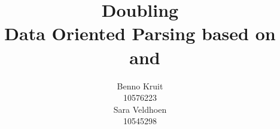 \documentclass[11pt]{article}
\title{Doubling \dops \\ 
{\normalsize Data Oriented Parsing based on \ddop~and \dops}}
\author{Benno Kruit\\10576223\\\And
Sara Veldhoen\\10545298\\}
\date{}
\begin{document}
\newcommand{\dops}[0]{DOP$ ^*$}
\newcommand{\ddop}[0]{Double-DOP}

\maketitle













%
%



\end{document}
